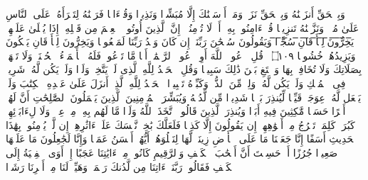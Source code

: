 \startbuffer[\q:17:105]
وَبِٱلۡحَقِّ أَنزَلۡنَٰهُ وَبِٱلۡحَقِّ نَزَلَۗ وَمَاۤ أَرۡسَلۡنَٰكَ إِلَّا مُبَشِّرࣰا وَنَذِیرࣰا%
\stopbuffer
\startbuffer[\q:17:106]
وَقُرۡءَانࣰا فَرَقۡنَٰهُ لِتَقۡرَأَهُۥ عَلَى ٱلنَّاسِ عَلَىٰ مُكۡثࣲ وَنَزَّلۡنَٰهُ تَنزِیلࣰا%
\stopbuffer
\startbuffer[\q:17:107]
قُلۡ ءَامِنُوا۟ بِهِۦۤ أَوۡ لَا تُؤۡمِنُوۤا۟ۚ إِنَّ ٱلَّذِینَ أُوتُوا۟ ٱلۡعِلۡمَ مِن قَبۡلِهِۦۤ إِذَا یُتۡلَىٰ عَلَیۡهِمۡ یَ̅خِ̅رُّ̅و̅نَ̅ ̅لِ̅لۡ̅أَ̅ذۡ̅قَ̅ا̅نِ̅ ̅سُ̅جَّ̅دࣰ̅ا̅%
\stopbuffer
\startbuffer[\q:17:108]
وَیَقُولُونَ سُبۡحَٰنَ رَبِّنَاۤ إِن كَانَ وَعۡدُ رَبِّنَا لَمَفۡعُولࣰا%
\stopbuffer
\startbuffer[\q:17:109]
وَیَخِرُّونَ لِلۡأَذۡقَانِ یَبۡكُونَ وَیَزِیدُهُمۡ خُشُوعࣰا ۝١٠٩ ۩%
\stopbuffer
\startbuffer[\q:17:110]
قُلِ ٱدۡعُوا۟ ٱللَّهَ أَوِ ٱدۡعُوا۟ ٱلرَّحۡمَٰنَۖ أَیࣰّا مَّا تَدۡعُوا۟ فَلَهُ ٱلۡأَسۡمَاۤءُ ٱلۡحُسۡنَىٰۚ وَلَا تَجۡهَرۡ بِصَلَاتِكَ وَلَا تُخَافِتۡ بِهَا وَٱبۡتَغِ بَیۡنَ ذَٰلِكَ سَبِیلࣰا%
\stopbuffer
\startbuffer[\q:17:111]
وَقُلِ ٱلۡحَمۡدُ لِلَّهِ ٱلَّذِی لَمۡ یَتَّخِذۡ وَلَدࣰا وَلَمۡ یَكُن لَّهُۥ شَرِیكࣱ فِی ٱلۡمُلۡكِ وَلَمۡ یَكُن لَّهُۥ وَلِیࣱّ مِّنَ ٱلذُّلِّۖ وَكَبِّرۡهُ تَكۡبِیرَۢا%
\stopbuffer
\startbuffer[\q:18:1]
ٱلۡحَمۡدُ لِلَّهِ ٱلَّذِیۤ أَنزَلَ عَلَىٰ عَبۡدِهِ ٱلۡكِتَٰبَ وَلَمۡ یَجۡعَل لَّهُۥ عِوَجَاۜ%
\stopbuffer
\startbuffer[\q:18:2]
قَیِّمࣰا لِّیُنذِرَ بَأۡسࣰا شَدِیدࣰا مِّن لَّدُنۡهُ وَیُبَشِّرَ ٱلۡمُؤۡمِنِینَ ٱلَّذِینَ یَعۡمَلُونَ ٱلصَّٰلِحَٰتِ أَنَّ لَهُمۡ أَجۡرًا حَسَنࣰا%
\stopbuffer
\startbuffer[\q:18:3]
مَّٰكِثِینَ فِیهِ أَبَدࣰا%
\stopbuffer
\startbuffer[\q:18:4]
وَیُنذِرَ ٱلَّذِینَ قَالُوا۟ ٱتَّخَذَ ٱللَّهُ وَلَدࣰا%
\stopbuffer
\startbuffer[\q:18:5]
مَّا لَهُم بِهِۦ مِنۡ عِلۡمࣲ وَلَا لِءَابَاۤئِهِمۡۚ كَبُرَتۡ كَلِمَةࣰ تَخۡرُجُ مِنۡ أَفۡوَٰهِهِمۡۚ إِن یَقُولُونَ إِلَّا كَذِبࣰا%
\stopbuffer
\startbuffer[\q:18:6]
فَلَعَلَّكَ بَٰخِعࣱ نَّفۡسَكَ عَلَىٰۤ ءَاثَٰرِهِمۡ إِن لَّمۡ یُؤۡمِنُوا۟ بِهَٰذَا ٱلۡحَدِیثِ أَسَفًا%
\stopbuffer
\startbuffer[\q:18:7]
إِنَّا جَعَلۡنَا مَا عَلَى ٱلۡأَرۡضِ زِینَةࣰ لَّهَا لِنَبۡلُوَهُمۡ أَیُّهُمۡ أَحۡسَنُ عَمَلࣰا%
\stopbuffer
\startbuffer[\q:18:8]
وَإِنَّا لَجَٰعِلُونَ مَا عَلَیۡهَا صَعِیدࣰا جُرُزًا%
\stopbuffer
\startbuffer[\q:18:9]
أَمۡ حَسِبۡتَ أَنَّ أَصۡحَٰبَ ٱلۡكَهۡفِ وَٱلرَّقِیمِ كَانُوا۟ مِنۡ ءَایَٰتِنَا عَجَبًا%
\stopbuffer
\startbuffer[\q:18:10]
إِذۡ أَوَى ٱلۡفِتۡیَةُ إِلَى ٱلۡكَهۡفِ فَقَالُوا۟ رَبَّنَاۤ ءَاتِنَا مِن لَّدُنكَ رَحۡمَةࣰ وَهَیِّئۡ لَنَا مِنۡ أَمۡرِنَا رَشَدࣰا%
\stopbuffer
